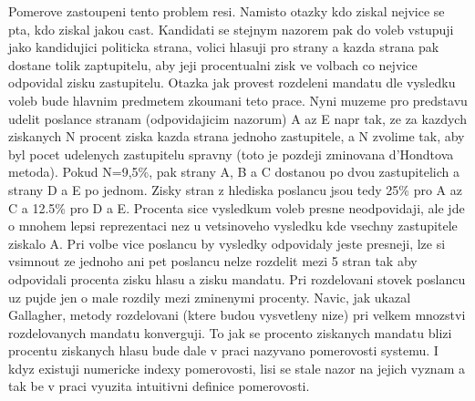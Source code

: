 \documentclass[12pt,a4paper]{report}
\begin{document}
Pomerove zastoupeni tento problem resi.
Namisto otazky kdo ziskal nejvice se pta, kdo ziskal jakou cast. Kandidati se stejnym nazorem pak do voleb vstupuji jako kandidujici politicka strana, volici hlasuji pro strany a kazda strana pak dostane tolik zaptupitelu, aby jeji procentualni zisk ve volbach co nejvice odpovidal zisku zastupitelu.
Otazka jak provest rozdeleni mandatu dle vysledku voleb bude hlavnim predmetem zkoumani teto prace.
Nyni muzeme pro predstavu udelit poslance stranam (odpovidajicim nazorum) A az E napr tak, ze za kazdych ziskanych N procent ziska kazda strana jednoho zastupitele, a N zvolime tak, aby byl pocet udelenych zastupitelu spravny (toto je pozdeji zminovana d'Hondtova metoda).
Pokud N=9,5\%, pak strany A, B a C dostanou po dvou zastupitelich a strany D a E po jednom.
Zisky stran z hlediska poslancu jsou tedy 25\% pro A az C a 12.5\% pro D a E.
Procenta sice vysledkum voleb presne neodpovidaji, ale jde o mnohem lepsi reprezentaci nez u vetsinoveho vysledku kde vsechny zastupitele ziskalo A.
Pri volbe vice poslancu by vysledky odpovidaly jeste presneji, lze si vsimnout ze jednoho ani pet poslancu nelze  rozdelit mezi 5 stran tak aby odpovidali procenta zisku hlasu a zisku mandatu.
Pri rozdelovani stovek poslancu uz pujde jen o male rozdily mezi zminenymi procenty.
Navic, jak ukazal Gallagher, metody rozdelovani (ktere budou vysvetleny nize) pri velkem mnozstvi rozdelovanych mandatu konverguji.\autocite{GAL1}
To jak se procento ziskanych mandatu  blizi procentu ziskanych hlasu bude dale v praci nazyvano pomerovosti systemu.
I kdyz existuji numericke indexy pomerovosti, lisi se stale nazor na jejich vyznam a tak be v praci vyuzita intuitivni definice pomerovosti. 
\end{document}
